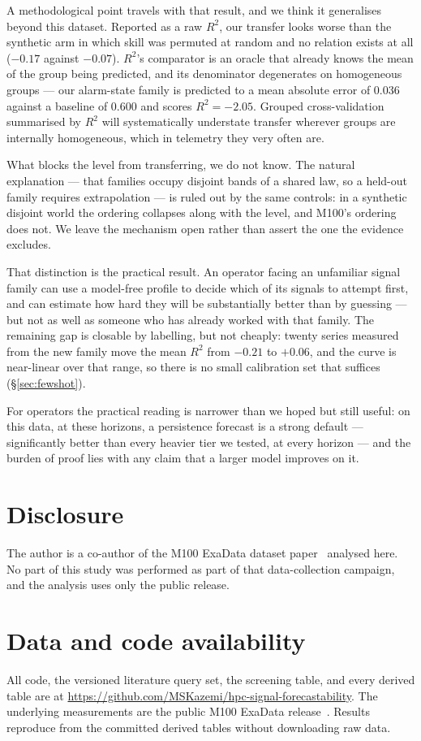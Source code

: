 \documentclass[11pt,a4paper]{article}
\newcommand{\num}[1]{#1}
\begin{document}
A methodological point travels with that result, and we think it generalises
beyond this dataset. Reported as a raw \(R^2\), our transfer looks worse than
the synthetic arm in which skill was permuted at random and no relation exists
at all (\(-0.17\) against \(-0.07\)). \(R^2\)'s comparator is an oracle that
already knows the mean of the group being predicted, and its denominator
degenerates on homogeneous groups --- our alarm-state family is predicted to a
mean absolute error of \num{0.036} against a baseline of \num{0.600} and scores
\(R^2=-2.05\). Grouped cross-validation summarised by \(R^2\) will
systematically understate transfer wherever groups are internally homogeneous,
which in telemetry they very often are.

What blocks the level from transferring, we do not know. The natural
explanation --- that families occupy disjoint bands of a shared law, so a
held-out family requires extrapolation --- is ruled out by the same controls:
in a synthetic disjoint world the ordering collapses along with the level, and
M100's ordering does not. We leave the mechanism open rather than assert the
one the evidence excludes.

That distinction is the practical result. An operator facing an unfamiliar
signal family can use a model-free profile to decide which of its signals to
attempt first, and can estimate how hard they will be substantially better than
by guessing --- but not as well as someone who has already worked with that
family. The remaining gap is closable by labelling, but not cheaply: twenty
series measured from the new family move the mean \(R^2\) from \(-0.21\) to
\(+0.06\), and the curve is near-linear over that range, so there is no small
calibration set that suffices (\S\ref{sec:fewshot}).

For operators the practical reading is narrower than we hoped but still useful:
on this data, at these horizons, a persistence forecast is a strong default ---
significantly better than every heavier tier we tested, at every horizon --- and
the burden of proof lies with any claim that a larger model improves on it.

\section*{Disclosure}

The author is a co-author of the M100 ExaData dataset paper~\citep{borghesi2023m100}
analysed here. No part of this study was performed as part of that data-collection
campaign, and the analysis uses only the public release.

\section*{Data and code availability}

All code, the versioned literature query set, the screening table, and every
derived table are at
\url{https://github.com/MSKazemi/hpc-signal-forecastability}. The underlying
measurements are the public M100 ExaData release~\citep{borghesi2023m100}.
Results reproduce from the committed derived tables without downloading raw
data.



\end{document}
